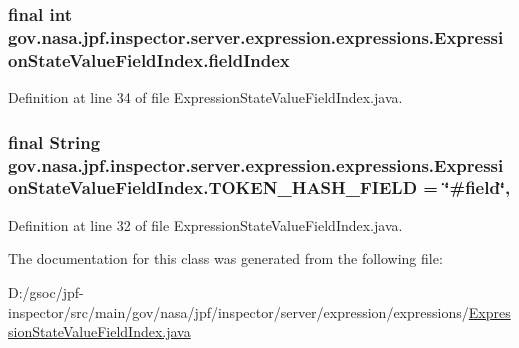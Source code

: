 \subsubsection[{\texorpdfstring{field\+Index}{fieldIndex}}]{\setlength{\rightskip}{0pt plus 5cm}final int gov.\+nasa.\+jpf.\+inspector.\+server.\+expression.\+expressions.\+Expression\+State\+Value\+Field\+Index.\+field\+Index\hspace{0.3cm}{\ttfamily [private]}}\hypertarget{classgov_1_1nasa_1_1jpf_1_1inspector_1_1server_1_1expression_1_1expressions_1_1_expression_state_value_field_index_a73e1be57f920f5d0fd849d0d734ccf6a}{}\label{classgov_1_1nasa_1_1jpf_1_1inspector_1_1server_1_1expression_1_1expressions_1_1_expression_state_value_field_index_a73e1be57f920f5d0fd849d0d734ccf6a}


Definition at line 34 of file Expression\+State\+Value\+Field\+Index.\+java.

\subsubsection[{\texorpdfstring{T\+O\+K\+E\+N\+\_\+\+H\+A\+S\+H\+\_\+\+F\+I\+E\+LD}{TOKEN_HASH_FIELD}}]{\setlength{\rightskip}{0pt plus 5cm}final String gov.\+nasa.\+jpf.\+inspector.\+server.\+expression.\+expressions.\+Expression\+State\+Value\+Field\+Index.\+T\+O\+K\+E\+N\+\_\+\+H\+A\+S\+H\+\_\+\+F\+I\+E\+LD = \char`\"{}\#field\char`\"{}\hspace{0.3cm}{\ttfamily [static]}, {\ttfamily [private]}}\hypertarget{classgov_1_1nasa_1_1jpf_1_1inspector_1_1server_1_1expression_1_1expressions_1_1_expression_state_value_field_index_ac0077fdbca5fba23a15891d0c4703ca0}{}\label{classgov_1_1nasa_1_1jpf_1_1inspector_1_1server_1_1expression_1_1expressions_1_1_expression_state_value_field_index_ac0077fdbca5fba23a15891d0c4703ca0}


Definition at line 32 of file Expression\+State\+Value\+Field\+Index.\+java.



The documentation for this class was generated from the following file\+:\begin{DoxyCompactItemize}
\item 
D\+:/gsoc/jpf-\/inspector/src/main/gov/nasa/jpf/inspector/server/expression/expressions/\hyperlink{_expression_state_value_field_index_8java}{Expression\+State\+Value\+Field\+Index.\+java}\end{DoxyCompactItemize}
